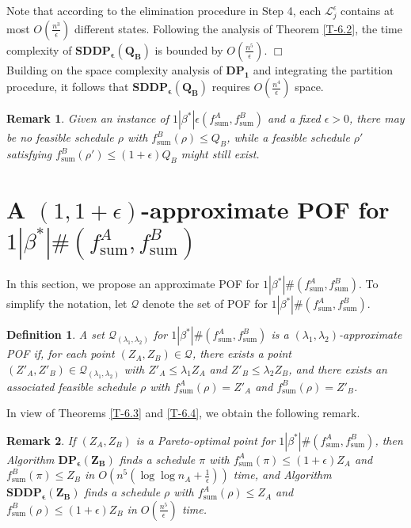 \documentclass[12pt]{article}
\newtheorem{rem}{Remark}[section]
\newtheorem{definition}{Definition}[section]
\begin{document}
\begin{sloppypar}
Note that according to the elimination procedure in Step 4, each $\mathcal{L}_j^{\epsilon}$ contains at most $O(\frac{n^3}{\epsilon})$ different states. Following the analysis of Theorem \ref{T-6.2}, the time complexity of $\mathbf{SDDP_{\epsilon}(Q_B)}$ is bounded by $O(\frac{n^5}{\epsilon})$. \hfill$\Box$\\

Building on the space complexity analysis of $\mathbf{DP_1}$ and integrating the partition procedure, it follows that $\mathbf{SDDP_{\epsilon}(Q_B)}$ requires $O(\frac{n^4}{\epsilon})$ space.  

\begin{rem} \label{R-6.1}
Given an instance of $1 | \beta^{*}|\epsilon(f_{\mathrm{sum}}^A, f_{\mathrm{sum}}^B)$ and a fixed $\epsilon>0$, there may be no feasible schedule $\rho$ with $f_{\mathrm{sum}}^B(\rho) \leq Q_B$, while a feasible schedule $\rho'$ satisfying $f_{\mathrm{sum}}^B(\rho') \leq (1+\epsilon) Q_B$ might still exist.
\end{rem}  

\section{A $(1, 1+\epsilon)$-approximate POF for $1 | \beta^{*}|\#(f_{\mathrm{sum}}^A, f_{\mathrm{sum}}^B)$}

In this section, we propose an approximate POF for $1 | \beta^{*}|\#(f_{\mathrm{sum}}^A, f_{\mathrm{sum}}^B)$. To simplify the notation, let $\mathcal{Q}$ denote the set of POF for $1 | \beta^{*}|\#(f_{\mathrm{sum}}^A, f_{\mathrm{sum}}^B)$. 

\begin{definition} \label{D-7.1}
A set $\mathcal{Q}_{(\lambda_1, \lambda_2)}$ for $1 | \beta^{*}|\#(f_{\mathrm{sum}}^A, f_{\mathrm{sum}}^B)$ is a $(\lambda_1, \lambda_2)$-approximate POF if, for each point $(Z_A, Z_B) \in \mathcal{Q}$, there exists a point $(Z'_A, Z'_B) \in \mathcal{Q}_{(\lambda_1, \lambda_2)}$ with $Z'_A \leq \lambda_1 Z_A$ and $Z'_B \leq \lambda_2 Z_B$, and there exists an associated feasible schedule $\rho$ with $f_{\mathrm{sum}}^A(\rho)= Z'_A$ and $f_{\mathrm{sum}}^B(\rho) =Z'_B$.
\end{definition}

In view of Theorems \ref{T-6.3} and \ref{T-6.4}, we obtain the following remark.

\begin{rem} \label{R-7.1}
If $(Z_A, Z_B)$ is a Pareto-optimal point for $1 | \beta^{*}|\#(f_{\mathrm{sum}}^A, f_{\mathrm{sum}}^B)$, then Algorithm $\mathbf{DP_{\epsilon}(Z_B)}$ finds a schedule $\pi$ with $f_{\mathrm{sum}}^A(\pi) \leq (1+\epsilon) Z_A$ and $f_{\mathrm{sum}}^B(\pi) \leq Z_B$ in $O(n^5(\log \log n_A +\frac{1}{\epsilon}))$ time, and  Algorithm $\mathbf{SDDP_{\epsilon}(Z_B)}$ finds a schedule $\rho$ with $f_{\mathrm{sum}}^A(\rho) \leq Z_A$ and $f_{\mathrm{sum}}^B(\rho)  \leq (1+\epsilon) Z_B$ in $O(\frac{n^5}{\epsilon})$ time.
\end{rem} 


\end{sloppypar}
\end{document}

